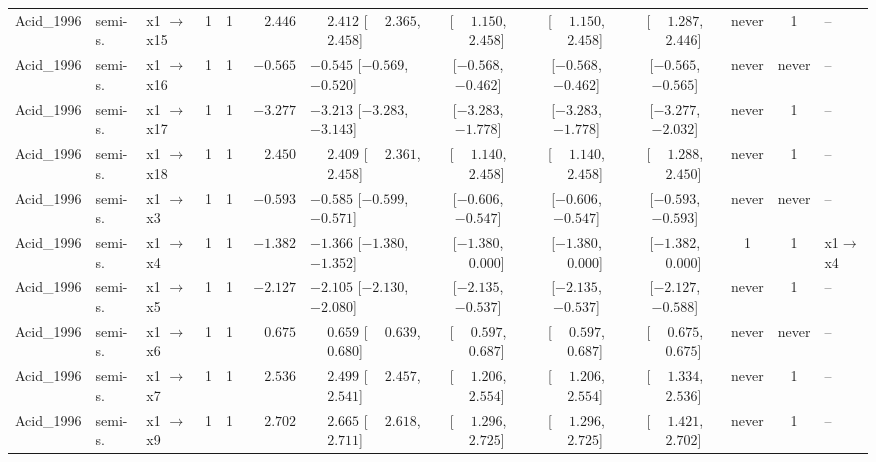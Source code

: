 \begin{landscape}
\begin{longtable}{@{}llp{2.15cm}ccrl cccc c l@{}}
Acid\_1996 & semi-s. & x1 $\to$ x15 & 1 & 1 & $\phantom{-}2.446$ & $\phantom{-}2.412$ [$\phantom{-}2.365$, $\phantom{-}2.458$] & [$\phantom{-}1.150$, $\phantom{-}2.458$] & [$\phantom{-}1.150$, $\phantom{-}2.458$] & [$\phantom{-}1.287$, $\phantom{-}2.446$] & never & 1 & -- \\
Acid\_1996 & semi-s. & x1 $\to$ x16 & 1 & 1 & $-0.565$ & $-0.545$ [$-0.569$, $-0.520$] & [$-0.568$, $-0.462$] & [$-0.568$, $-0.462$] & [$-0.565$, $-0.565$] & never & never & -- \\
Acid\_1996 & semi-s. & x1 $\to$ x17 & 1 & 1 & $-3.277$ & $-3.213$ [$-3.283$, $-3.143$] & [$-3.283$, $-1.778$] & [$-3.283$, $-1.778$] & [$-3.277$, $-2.032$] & never & 1 & -- \\
Acid\_1996 & semi-s. & x1 $\to$ x18 & 1 & 1 & $\phantom{-}2.450$ & $\phantom{-}2.409$ [$\phantom{-}2.361$, $\phantom{-}2.458$] & [$\phantom{-}1.140$, $\phantom{-}2.458$] & [$\phantom{-}1.140$, $\phantom{-}2.458$] & [$\phantom{-}1.288$, $\phantom{-}2.450$] & never & 1 & -- \\
Acid\_1996 & semi-s. & x1 $\to$ x3 & 1 & 1 & $-0.593$ & $-0.585$ [$-0.599$, $-0.571$] & [$-0.606$, $-0.547$] & [$-0.606$, $-0.547$] & [$-0.593$, $-0.593$] & never & never & -- \\
Acid\_1996 & semi-s. & x1 $\to$ x4 & 1 & 1 & $-1.382$ & $-1.366$ [$-1.380$, $-1.352$] & [$-1.380$, $\phantom{-}0.000$] & [$-1.380$, $\phantom{-}0.000$] & [$-1.382$, $\phantom{-}0.000$] & 1 & 1 & x1$\to$x4 \\
Acid\_1996 & semi-s. & x1 $\to$ x5 & 1 & 1 & $-2.127$ & $-2.105$ [$-2.130$, $-2.080$] & [$-2.135$, $-0.537$] & [$-2.135$, $-0.537$] & [$-2.127$, $-0.588$] & never & 1 & -- \\
Acid\_1996 & semi-s. & x1 $\to$ x6 & 1 & 1 & $\phantom{-}0.675$ & $\phantom{-}0.659$ [$\phantom{-}0.639$, $\phantom{-}0.680$] & [$\phantom{-}0.597$, $\phantom{-}0.687$] & [$\phantom{-}0.597$, $\phantom{-}0.687$] & [$\phantom{-}0.675$, $\phantom{-}0.675$] & never & never & -- \\
Acid\_1996 & semi-s. & x1 $\to$ x7 & 1 & 1 & $\phantom{-}2.536$ & $\phantom{-}2.499$ [$\phantom{-}2.457$, $\phantom{-}2.541$] & [$\phantom{-}1.206$, $\phantom{-}2.554$] & [$\phantom{-}1.206$, $\phantom{-}2.554$] & [$\phantom{-}1.334$, $\phantom{-}2.536$] & never & 1 & -- \\
Acid\_1996 & semi-s. & x1 $\to$ x9 & 1 & 1 & $\phantom{-}2.702$ & $\phantom{-}2.665$ [$\phantom{-}2.618$, $\phantom{-}2.711$] & [$\phantom{-}1.296$, $\phantom{-}2.725$] & [$\phantom{-}1.296$, $\phantom{-}2.725$] & [$\phantom{-}1.421$, $\phantom{-}2.702$] & never & 1 & -- \\

\end{longtable}
\end{landscape}
